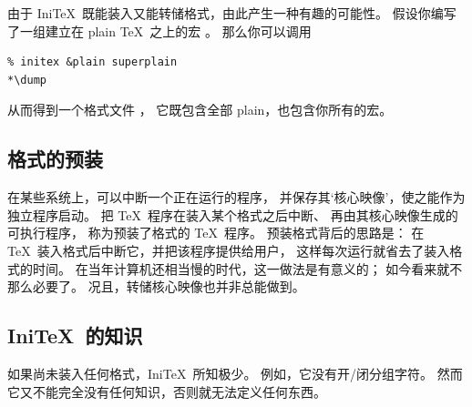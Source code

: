 \documentclass[a4paper]{rapport3}
\def\IniTeX{Ini\TeX}\def\LamsTeX{LAMS\TeX}\def\VirTeX{Vir\TeX}
\begin{document}
由于 \IniTeX\ 既能装入又能转储格式，由此产生一种有趣的可能性。
假设你编写了一组建立在 plain \TeX\ 之上的宏 。
那么你可以调用
\begin{verbatim}
% initex &plain superplain
*\dump
\end{verbatim}
从而得到一个格式文件 ，
它既包含全部 plain，也包含你所有的宏。

\subsection{格式的预装}

在某些系统上，可以中断一个正在运行的程序，
并保存其`核心映像'，使之能作为独立程序启动。
把 \TeX\ 程序在装入某个格式之后中断、
再由其核心映像生成的可执行程序，
称为预装了格式的 \TeX\ 程序。
预装格式背后的思路是：
在 \TeX\ 装入格式后中断它，并把该程序提供给用户，
这样每次运行就省去了装入格式的时间。
在当年计算机还相当慢的时代，这一做法是有意义的；
如今看来就不那么必要了。
况且，转储核心映像也并非总能做到。

\subsection{\IniTeX\ 的知识}

如果尚未装入任何格式，\IniTeX\ 所知极少。
例如，它没有开/闭分组字符。
然而它又不能完全没有任何知识，否则就无法定义任何东西。
\end{document}
